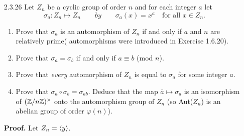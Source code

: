 \begin{enumerate}
      \textbf{Proof.} We will only prove the second part. Let $G$ be a group of
      order $n$, $(k, n) = 1$, and $x \mapsto x^k$ be a map from $G$ to itself.
      Let $y \in G$. Since $k$ is relatively prime to $n$, there exist integers 
      $a$ and $b$ such that $ak+bn=1$. Thus
      $y = y^{ak+bn} = y^{ak}{y^n}^b = (y^a)^k$. Thus $y^a \mapsto (y^a)^k = y$;
      that is, the map is surjective. \qed
   \item[2.3.26]  Let $Z_n$ be a cyclic group of order $n$ and for each integer
                  $a$ let
                  $$\sigma_a : Z_n \mapsto Z_n \qquad by \qquad \sigma_a(x) =
                  x^a \quad \text{for all } x \in Z_n.$$
                  \begin{enumerate}
                     \item Prove that $\sigma_a$ is an automorphism of $Z_n$ if
                           and only if $a$ and $n$ are relatively prime(
                           automorphisms were introduced in Exercise 1.6.20).
                     \item Prove that $\sigma_a = \sigma_b$ if and only if
                           $a \equiv b$ (mod $n$).
                     \item Prove that \textit{every} automorphism of $Z_n$ is
                           equal to $\sigma_a$ for some integer $a$.
                     \item Prove that $\sigma_a\circ\sigma_b=\sigma_{ab}$.
                           Deduce that the map $\overline{a} \mapsto \sigma_a$
                           is an isomorphism of $(\mathbb{Z}/n\mathbb{Z})^\times$ onto the
                           automorphism group of $Z_n$ (so Aut($Z_n$) is an
                           abelian group of order $\varphi(n)$).
                  \end{enumerate}

      \textbf{Proof.} Let $Z_n = \langle y \rangle$. 


\end{enumerate}
